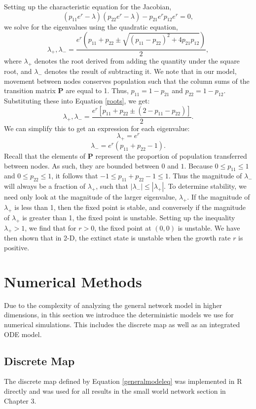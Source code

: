 \documentclass[12pt, openany]{book}
\theoremstyle{definition}
\theoremstyle{remark}
\numberwithin{equation}{chapter}
\numberwithin{figure}{chapter}
\begin{document}
Setting up the characteristic equation for the Jacobian,
$$(p_{11}e^r - \lambda)(p_{22}e^r - \lambda) - p_{21}e^rp_{12}e^r = 0,$$
we solve for the eigenvalues using the quadratic equation,
\begin{equation}\label{roots}
\lambda_+, \lambda_- = \frac{e^r\left(p_{11} + p_{22} \pm \sqrt{(p_{11}-p_{22})^2 + 4p_{21}p_{12}}\right)}{2},
\end{equation}
where $\lambda_+$ denotes the root derived from adding the quantity under the square root, and $\lambda_-$ denotes the result of subtracting it. We note that in our model, movement between nodes conserves population such that the column sums of the transition matrix $\textbf{P}$ are equal to 1. Thus, $p_{11} = 1-p_{21}$ and $p_{22} = 1- p_{12}$. Substituting these into Equation \ref{roots}, we get:
\begin{equation}\label{2dstabilityconserve}
\lambda_+, \lambda_- = \frac{e^r\left[p_{11} + p_{22} \pm (2-p_{11}-p_{22})\right]}{2}.
\end{equation}
We can simplify this to get an expression for each eigenvalue: 
$$\lambda_+ = e^r$$
$$\lambda_- = e^r(p_{11}+p_{22} - 1).$$
Recall that the elements of $\textbf{P}$ represent the proportion of population transferred between nodes. As such, they are bounded between $0$ and $1$. Because $0 \leq p_{11} \leq 1$ and $0 \leq p_{22} \leq 1$, it follows that $-1 \leq p_{11} + p_{22} - 1 \leq 1$. Thus the magnitude of $\lambda_-$ will always be a fraction of $\lambda_+$, such that $|\lambda_-| \leq |\lambda_+|$. To determine stability, we need only look at the magnitude of the larger eigenvalue, $\lambda_+$. If the magnitude of $\lambda_+$ is less than 1, then the fixed point is stable, and conversely if the magnitude of $\lambda_+$ is greater than 1, the fixed point is unstable. Setting up the inequality $\lambda_+ > 1$, we find that for $r > 0$, the fixed point at $(0,0)$ is unstable. We have then shown that in 2-D, the extinct state is unstable when the growth rate $r$ is positive.

\section{Numerical Methods}
Due to the complexity of analyzing the general network model in higher dimensions, in this section we introduce the deterministic models we use for numerical simulations. This includes the discrete map as well as an integrated ODE model. 

\subsection{Discrete Map}
The discrete map defined by Equation \ref{generalmodeleq} was implemented in R directly and was used for all results in the small world network section in Chapter 3.
\end{document}
